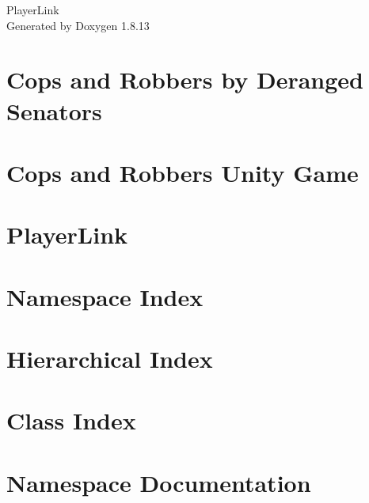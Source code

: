 \documentclass[twoside]{book}
\newcommand{\+}{\discretionary{\mbox{\scriptsize$\hookleftarrow$}}{}{}}
\newcommand{\clearemptydoublepage}{%
  \newpage{\pagestyle{empty}\cleardoublepage}%
}
\begin{document}
\hypersetup{pageanchor=false,
             bookmarksnumbered=true,
             pdfencoding=unicode
            }
\begin{titlepage}
\vspace*{7cm}
\begin{center}%
{\Large Player\+Link }\\
\vspace*{1cm}
{\large Generated by Doxygen 1.8.13}\\
\end{center}
\end{titlepage}
\clearemptydoublepage
{}
\tableofcontents
\clearemptydoublepage
{}
\hypersetup{pageanchor=true}

\chapter{Cops and Robbers by Deranged Senators}
\label{md_codedoc_copsandrobbers_doxygen_index}

\chapter{Cops and Robbers Unity Game}
\label{md_codedoc_copsandrobbers_readme}

\chapter{Player\+Link}
\label{md_codedoc_playerlink_doxygen_index}

\chapter{Namespace Index}

\chapter{Hierarchical Index}

\chapter{Class Index}

\chapter{Namespace Documentation}





\end{document}
